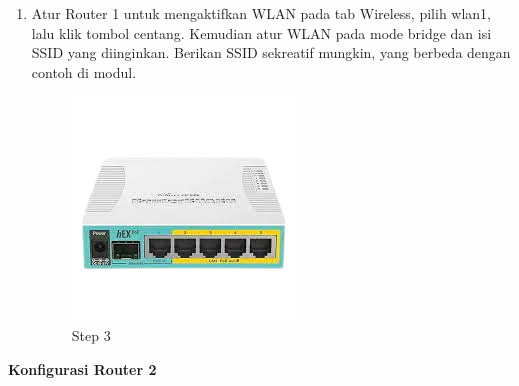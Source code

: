 \begin{enumerate}
	\item Atur Router 1 untuk mengaktifkan WLAN pada tab Wireless, pilih wlan1, lalu klik tombol centang.
	Kemudian atur WLAN pada mode bridge dan isi SSID yang diinginkan. Berikan SSID sekreatif
	mungkin, yang berbeda dengan contoh di modul.
	
	\begin{figure}[H]
		\centering
		\includegraphics[width=0.5\linewidth]{P1/img/contoh.png}
		\caption{Step 3}
		\label{fig:gambar4}
	\end{figure}

\end{enumerate}

\begin{center} 
	\textbf{Konfigurasi Router 2}
\end{center}


